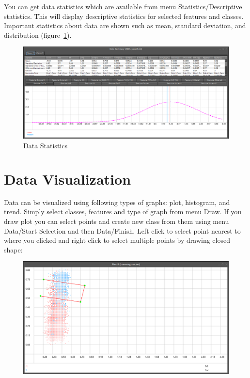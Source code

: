 \documentclass[a4paper,12pt,english]{report}
\begin{document}
You can get data statistics which are available from menu Statistics/Descriptive statistics. This will display descriptive statistics for selected features and classes. Important statistics about data are shown such as mean, standard deviation,  and distribution  (figure~\ref{fig:fig3}).
\newpage
\begin{figure}[htb]
\centering
\includegraphics[width=400pt]{fig3.png}
\caption{Data Statistics}
\label{fig:fig3}
\end{figure}

\newpage
\section*{Data Visualization}

Data can be visualized using following types of graphs: plot, histogram, and trend. Simply select classes, features and type of graph from menu Draw. If you draw plot you can select points and create new class from them using menu Data/Start Selection and then Data/Finish. Left click to select point nearest to where you clicked and right click to select multiple points by drawing closed shape:

\begin{figure}[htb]
\centering
\includegraphics[width=320pt]{fig4.png}
\end{figure}
\end{document}
